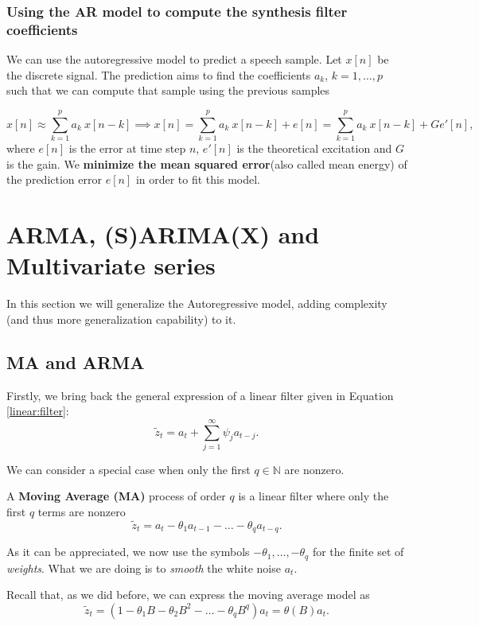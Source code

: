 \subsubsection*{Using the AR model to compute the synthesis filter coefficients}

We can use the autoregressive model to predict a speech sample. Let \(x[n]\) be the discrete signal. The prediction aims to find the coefficients \(a_k\), \(k = 1,\dots, p\) such that we can compute that sample using the previous samples

\[
x[n] \approx \sum_{k=1}^p a_k \ x[n-k] \implies x[n] = \sum_{k=1}^p a_k \ x[n-k] + e[n] = \sum_{k=1}^p a_k \ x[n-k] + Ge'[n],
\]
where \(e[n]\) is the error at time step \(n\), \(e'[n]\) is the theoretical excitation and \(G\) is the gain. We \textbf{minimize the mean squared error}(also called mean energy) of the prediction error \(e[n]\) in order to fit this model.

\section{ARMA, (S)ARIMA(X) and Multivariate series}


In this section we will generalize the Autoregressive model, adding complexity (and thus more generalization capability) to it.

\subsection{MA and ARMA}

Firstly, we bring back the general expression of a linear filter given in Equation \eqref{linear:filter}:
\[
\tilde z_t = a_t + \sum_{j=1}^\infty \psi_j a_{t-j}. 
\]

We can consider a special case when only the first \(q \in \mathbb N\) are nonzero.

\begin{ndef}
A \textbf{Moving Average (MA)} process of order \(q\) is a linear filter where only the first \(q\) terms are nonzero
\begin{equation}\label{model:MA}
\tilde z_t = a_t - \theta_1 a_{t-1} - \dots - \theta_q a_{t-q}.
\end{equation}
\end{ndef}
As it can be appreciated, we now use the symbols \(-\theta_1,\dots, -\theta_q\) for the finite set of \emph{weights}. What we are doing is to \emph{smooth} the white noise \(a_t\).


Recall that, as we did before, we can express the moving average model as
\[
\tilde z_t = (1- \theta_1 B - \theta_2 B^2 - \dots - \theta_q B^q) a_t = \theta(B) a_t.
\]

